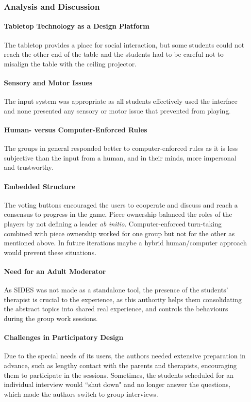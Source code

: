 \documentclass[runningheads]{llncs}
\begin{document}
\subsubsection{Analysis and Discussion}
\paragraph{Tabletop Technology as a Design Platform} The tabletop provides a place for social interaction, but some students could not reach the other end of the table and the students had to be careful not to misalign the table with the ceiling projector.
\paragraph{Sensory and Motor Issues} The input system was appropriate as all students effectively used the interface and none presented any sensory or motor issue that prevented from playing.
\paragraph{Human- versus Computer-Enforced Rules} The groups in general responded better to computer-enforced rules as it is less subjective than the input from a human, and in their minds, more impersonal and trustworthy.
\paragraph{Embedded Structure} The voting buttons encouraged the users to cooperate and discuss and reach a consensus to progress in the game. Piece ownership balanced the roles of the players by not defining a leader \textit{ab initio}. Computer-enforced turn-taking combined with piece ownership worked for one group but not for the other as mentioned above. In future iterations maybe a hybrid human/computer approach would prevent these situations.
\paragraph{Need for an Adult Moderator} As SIDES was not made as a standalone tool, the presence of the students' therapist is crucial to the experience, as this authority helps them consolidating the abstract topics into shared real experience, and controls the behaviours during the group work sessions.
\paragraph{Challenges in Participatory Design} Due to the special needs of its users, the authors needed extensive preparation in advance, such as lengthy contact with the parents and therapists, encouraging them to participate in the sessions. Sometimes, the students scheduled for an individual interview would ``shut down" and no longer answer the questions, which made the authors switch to group interviews.
\end{document}
